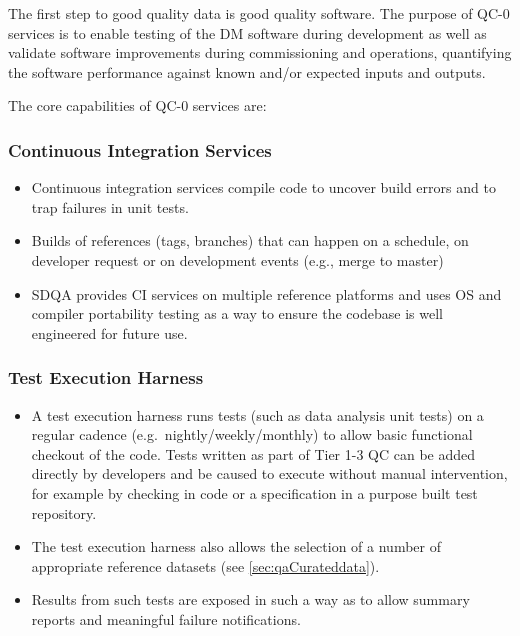 \documentclass[DM,toc,lsstdraft]{lsstdoc}
\begin{document}
The first step to good quality data is good quality software. The purpose of QC-0 services is to enable testing of the DM software during development as well as validate software improvements during commissioning and operations, quantifying the software performance against known and/or expected inputs and outputs.

The core capabilities of QC-0 services are:

\subsubsection{Continuous Integration Services}
\label{sec:qaCI}
\begin{itemize}

\item Continuous integration services compile code to uncover build errors and to trap failures in unit tests.

\item Builds of references (tags, branches) that can happen on a schedule, on developer request or on development events (e.g.,  merge to master)

\item SDQA provides CI services on multiple reference platforms and uses OS and compiler portability testing as a way to ensure the codebase is well engineered for future use.

\end{itemize}

\subsubsection{Test Execution Harness}
\label{sec:qaTestharness}
\begin{itemize}

\item A test execution harness runs tests (such as data analysis unit
  tests) on a regular cadence (e.g.\ nightly/weekly/monthly) to allow
  basic functional checkout of the code. Tests written as part of Tier
  1-3 QC can be added directly by developers and be caused to execute
  without manual intervention, for example by checking in code or a
  specification in a purpose built test repository.

\item The test execution harness also allows the selection of a number of appropriate reference datasets (see \ref{sec:qaCurateddata}).

\item Results from such tests are exposed in such a way as to allow summary reports and meaningful failure notifications.

\end{itemize}
\end{document}

